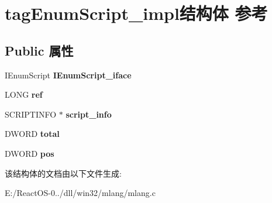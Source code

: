 \hypertarget{structtag_enum_script__impl}{}\section{tag\+Enum\+Script\+\_\+impl结构体 参考}
\label{structtag_enum_script__impl}
\subsection*{Public 属性}
\begin{DoxyCompactItemize}
\item 
\mbox{\label{structtag_enum_script__impl_ad01adbb651d842ea309b81ec0fa16574}} 
I\+Enum\+Script {\bfseries I\+Enum\+Script\+\_\+iface}
\item 
\mbox{\label{structtag_enum_script__impl_a26b17e43abad86b2bc1a577f73341af3}} 
L\+O\+NG {\bfseries ref}
\item 
\mbox{\label{structtag_enum_script__impl_ad2e5fedf3cd5b1d343df02b89b3e0a58}} 
S\+C\+R\+I\+P\+T\+I\+N\+FO $\ast$ {\bfseries script\+\_\+info}
\item 
\mbox{\label{structtag_enum_script__impl_a07b2d4ecae71984bdcde20fedeb3a45f}} 
D\+W\+O\+RD {\bfseries total}
\item 
\mbox{\label{structtag_enum_script__impl_af4c4312c4596ce9aa6ff84b54d8becf7}} 
D\+W\+O\+RD {\bfseries pos}
\end{DoxyCompactItemize}


该结构体的文档由以下文件生成\+:\begin{DoxyCompactItemize}
\item 
E\+:/\+React\+O\+S-\/0../dll/win32/mlang/mlang.\+c\end{DoxyCompactItemize}
